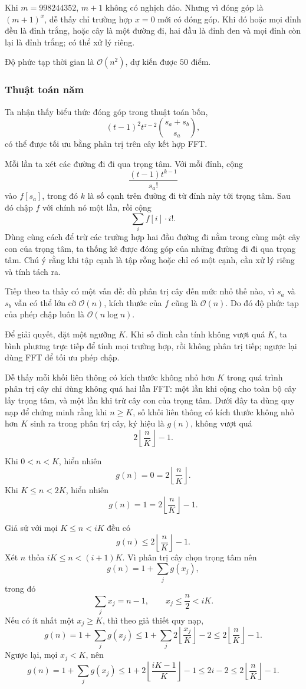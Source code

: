 \documentclass[11pt]{article}
\newcommand{\Oh}{\mathcal{O}}
\begin{document}
Khi \(m=998244352\), \(m+1\) không có nghịch đảo. Nhưng vì đóng góp là
\((m+1)^x\), dễ thấy chỉ trường hợp \(x=0\) mới có đóng góp. Khi đó hoặc mọi
đỉnh đều là đỉnh trắng, hoặc cây là một đường đi, hai đầu là đỉnh đen và mọi
đỉnh còn lại là đỉnh trắng; có thể xử lý riêng.

Độ phức tạp thời gian là \(\Oh(n^2)\), dự kiến được \(50\) điểm.

\subsubsection{Thuật toán năm}

Ta nhận thấy biểu thức đóng góp trong thuật toán bốn,
\[
  (t-1)^2t^{z-2}\binom{s_a+s_b}{s_a},
\]
có thể được tối ưu bằng phân trị trên cây kết hợp FFT.

Mỗi lần ta xét các đường đi đi qua trọng tâm. Với mỗi đỉnh, cộng
\[
  \frac{(t-1)t^{k-1}}{s_a!}
\]
vào \(f[s_a]\), trong đó \(k\) là số cạnh trên đường đi từ đỉnh này tới trọng
tâm. Sau đó chập \(f\) với chính nó một lần, rồi cộng
\[
  \sum_i f[i]\cdot i!.
\]
Dùng cùng cách để trừ các trường hợp hai đầu đường đi nằm trong cùng một cây
con của trọng tâm, ta thống kê được đóng góp của những đường đi đi qua trọng
tâm. Chú ý rằng khi tập cạnh là tập rỗng hoặc chỉ có một cạnh, cần xử lý riêng
và tính tách ra.

Tiếp theo ta thấy có một vấn đề: dù phân trị cây đến mức nhỏ thế nào, vì
\(s_a\) và \(s_b\) vẫn có thể lớn cỡ \(\Oh(n)\), kích thước của \(f\) cũng là
\(\Oh(n)\). Do đó độ phức tạp của phép chập luôn là \(\Oh(n\log n)\).

Để giải quyết, đặt một ngưỡng \(K\). Khi số đỉnh cần tính không vượt quá \(K\),
ta bình phương trực tiếp để tính mọi trường hợp, rồi không phân trị tiếp; ngược
lại dùng FFT để tối ưu phép chập.

Dễ thấy mỗi khối liên thông có kích thước không nhỏ hơn \(K\) trong quá trình
phân trị cây chỉ dùng không quá hai lần FFT: một lần khi cộng cho toàn bộ cây
lấy trọng tâm, và một lần khi trừ cây con của trọng tâm. Dưới đây ta dùng quy
nạp để chứng minh rằng khi \(n\ge K\), số khối liên thông có kích thước không
nhỏ hơn \(K\) sinh ra trong phân trị cây, ký hiệu là \(g(n)\), không vượt quá
\[
  2\left\lfloor\frac{n}{K}\right\rfloor-1.
\]

Khi \(0<n<K\), hiển nhiên
\[
  g(n)=0=2\left\lfloor\frac{n}{K}\right\rfloor.
\]
Khi \(K\le n<2K\), hiển nhiên
\[
  g(n)=1=2\left\lfloor\frac{n}{K}\right\rfloor-1.
\]

Giả sử với mọi \(K\le n<iK\) đều có
\[
  g(n)\le 2\left\lfloor\frac{n}{K}\right\rfloor-1.
\]
Xét \(n\) thỏa \(iK\le n<(i+1)K\). Vì phân trị cây chọn trọng tâm nên
\[
  g(n)=1+\sum_j g(x_j),
\]
trong đó
\[
  \sum_j x_j=n-1,\qquad x_j\le \frac{n}{2}<iK.
\]
Nếu có ít nhất một \(x_j\ge K\), thì theo giả thiết quy nạp,
\[
  g(n)=1+\sum_j g(x_j)
  \le 1+\sum_j 2\left\lfloor\frac{x_j}{K}\right\rfloor-2
  \le 2\left\lfloor\frac{n}{K}\right\rfloor-1.
\]
Ngược lại, mọi \(x_j<K\), nên
\[
  g(n)=1+\sum_j g(x_j)
  \le 1+2\left\lfloor\frac{iK-1}{K}\right\rfloor-1
  \le 2i-2
  \le 2\left\lfloor\frac{n}{K}\right\rfloor-1.
\]
\end{document}
